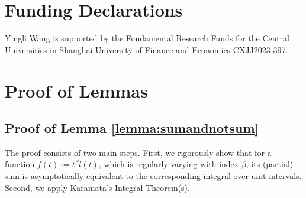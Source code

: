 \documentclass[letterpaper]{article}
\numberwithin{equation}{section}
\theoremstyle{definition}
\theoremstyle{remark}
\begin{document}
\section*{Funding Declarations}
Yingli Wang is supported by the Fundamental Research Funds for the Central Universities in Shanghai University of Finance and Economics CXJJ2023-397.



\appendix


\section{Proof of Lemmas}
\label{sec:proofoflemmas}


\subsection{Proof of Lemma \ref{lemma:sumandnotsum}}
\label{subsec:proofofsumandnotsum}

The proof consists of two main steps. First, we rigorously show that for a function $f(t) := t^{\beta} l(t)$, which is regularly varying with index ${\beta}$, its (partial) sum is asymptotically equivalent to the corresponding integral over unit intervals. Second, we apply Karamata's Integral Theorem(s).
\end{document}
